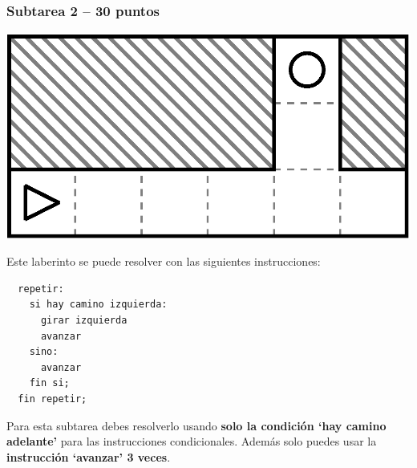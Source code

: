 \documentclass{oci}
\begin{document}
\subsubsection*{Subtarea 2 -- 30 puntos}
\begin{minipage}{0.5\linewidth}
  \centering
\includegraphics[scale=0.5]{laberintos/Subtarea2.eps}
\end{minipage}
\begin{minipage}{0.45\linewidth}

Este laberinto se puede resolver con las siguientes instrucciones:
\begin{verbatim}
  repetir:
    si hay camino izquierda:
      girar izquierda
      avanzar
    sino:
      avanzar
    fin si;
  fin repetir;
\end{verbatim}

Para esta subtarea debes resolverlo usando \textbf{solo la condición `hay camino adelante'} para las instrucciones condicionales.
Además solo puedes usar la \textbf{instrucción `avanzar' 3 veces}.
\end{minipage}
\end{document}
